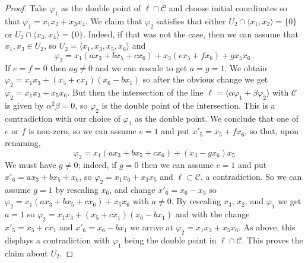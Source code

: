 \documentclass[10pt,reqno]{amsart}
\newcommand{\la}{\langle}
\newcommand{\ra}{\rangle}
\newcommand{\cC}{{\mathcal{C}}}
\renewcommand{\a}{\alpha}
\renewcommand{\b}{\beta}
\newcommand{\f}{\varphi}
\theoremstyle{definition}
\begin{document}
\begin{proof}
\item Take $\f_1$ as the double point of $\ell\cap\cC$ and choose initial coordinates so that $\f_1=x_1x_2+x_3x_4$. We claim that $\f_2$ satisfies that either $U_2\cap \la x_1, x_2 \ra=\{0\}$ or $U_2\cap \la x_3, x_4 \ra=\{0\}$. Indeed, if that was not the case, then we can assume that $x_1, x_3 \in U_2$, so $U_2=\la x_1,x_3,x_5,x_6 \ra$ and
\[
\f_2=x_1(ax_3+bx_5+cx_6)+x_3(ex_5+fx_6)+gx_5x_6 \, .
\]
If $e=f=0$ then $ag\neq 0$ and we can rescale to get $a=g=1$. We obtain $\f_2=x_1x_3+(x_5+cx_1)(x_6-bx_1)$ so after the obvious change we get $\f_2=x_1x_3+x_5x_6$. But then the intersection of the line $\ell=\la\a \f_1+\b \f_2\ra$ with $\cC$ is given by $\a^2\b=0$, so $\f_2$ is the double point of the intersection. This is a contradiction with our choice of $\f_1$ as the double point. We conclude that one of $e$ or $f$ is non-zero, so we can assume $e=1$ and put $x'_5=x_5+fx_6$, so that, upon renaming,
\[
\f_2=x_1(ax_3+bx_5+cx_6)+(x_3-gx_6)x_5
\]
We must have $g\ne 0$; indeed, if $g=0$ then we can assume $c=1$ and put $x'_6=ax_3+bx_5+x_6$, so $\f_2=x_1x_6+x_3x_5$ and $\ell \subset \cC$, a contradiction. So we can assume $g=1$ by rescaling $x_6$, and change $x'_6=x_6-x_3$ so $\f_2=x_1(ax_3+bx_5+cx_6)+x_5x_6$ with $a \ne 0$. By rescaling $x_3$, $x_2$, and $\f_1$ we get $a=1$ so $\f_2=x_1x_3+(x_5+cx_1)(x_6-bx_1)$ and with the change $x'_5=x_5+cx_1$ and $x'_6=x_6-bx_1$ we arrive at $\f_2=x_1x_3+x_5x_6$. As above, this displays a contradiction with $\f_1$ being the double point in $\ell\cap\cC$. This proves the claim about $U_2$. 


\end{proof}
\end{document}
